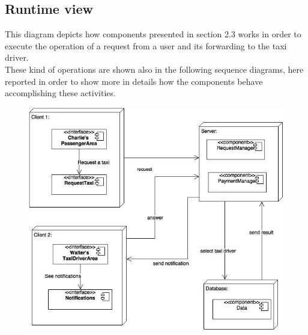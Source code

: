 		\subsection{Runtime view}
		This diagram depicts how components presented in section 2.3 works in order to execute the operation of a request from a user and its forwarding to the taxi driver.\\
		These kind of operations are shown also in the following sequence diagrams, here reported in order to show more in details how the components behave accomplishing these activities.
		\vspace{2cm}
			\begin{figure}[h]
				\centering
				\includegraphics[scale=0.65]{Diagrams/runTime.jpg}
			\end{figure}
